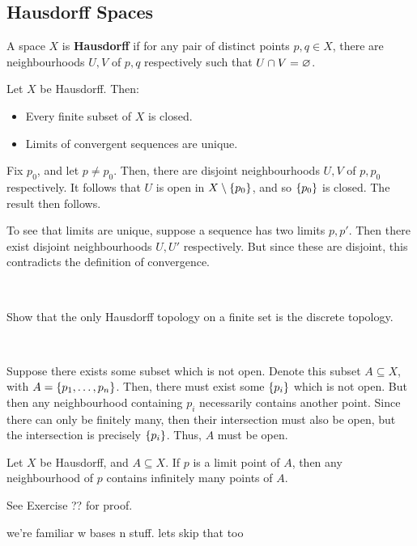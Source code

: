 \subsection{Hausdorff Spaces}

\begin{defn}
    A space $ X $ is \textbf{Hausdorff} if for any pair of distinct points $ p,q
    \in X $, there are neighbourhoods $ U, V $ of $ p, q $ respectively such that
    $ U \cap V = \varnothing $.
\end{defn}

\begin{prop}
    Let $ X $ be Hausdorff. Then:
    \begin{itemize}
        \item Every finite subset of $ X $ is closed.
        \item Limits of convergent sequences are unique.
    \end{itemize}
\end{prop}

\begin{pf}[source=Primary Source Material]
    Fix $ p_{0} $, and let $ p \neq p_{0} $. Then, there are disjoint
    neighbourhoods $ U, V $ of $ p, p_{0} $ respectively. It follows that $ U $
    is open in $ X \setminus \left\{{p_{0}}\right\} $, and so $ \left\{{p_{0}}\right\} $ is closed.
    The result then follows.

    To see that limits are unique, suppose a sequence has two limits $ p, p' $.
    Then there exist disjoint neighbourhoods $ U, U' $ respectively. But since
    these are disjoint, this contradicts the definition of convergence.
\end{pf} \

\newpage
\begin{exr}[source=Primary Source Material]
    Show that the only Hausdorff topology on a finite set is the discrete
    topology.
\end{exr} \

\begin{soln}
    Suppose  there exists some subset which is not open. Denote this subset
    $ A \subseteq X $, with $ A = \left\{{p_{1}, \dots, p_{n}}\right\} $. Then, there must
    exist some $ \left\{{p_{i}}\right\} $ which is not open. But then any neighbourhood
    containing $ p_{i} $ necessarily contains another point. Since there can only
    be finitely many, then their intersection must also be open, but the
    intersection is precisely $ \left\{{p_{i}}\right\} $. Thus, $ A $ must be open.
\end{soln}

\begin{prop}
    Let $ X $ be Hausdorff, and $ A \subseteq X $. If $ p $ is a limit point of
    $ A $, then any neighbourhood of $ p $ contains infinitely many points of
    $ A $.
\end{prop}

See Exercise ?? for proof.

we're familiar w bases n stuff. lets skip that too


